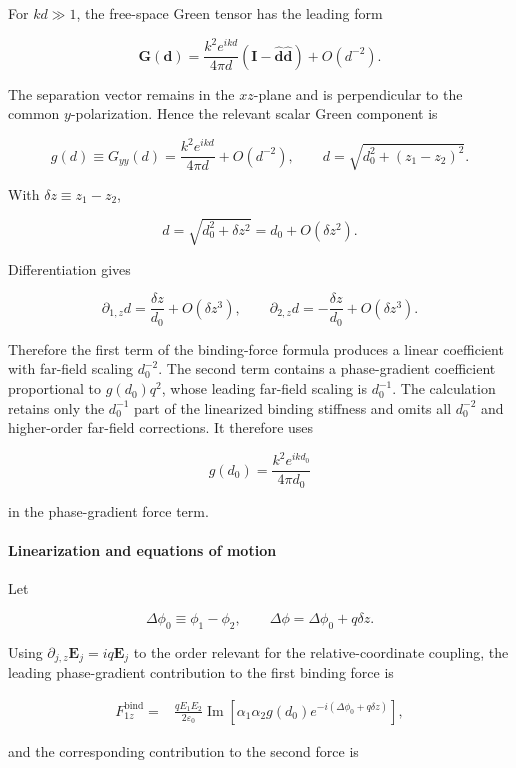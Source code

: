 For \(kd\gg1\), the free-space Green tensor has the leading form

\[
\mathbf G(\mathbf d)
=\frac{k^2e^{ikd}}{4\pi d}
\left(\mathbf I-\hat{\mathbf d}\hat{\mathbf d}\right)+O(d^{-2}).
\]

The separation vector remains in the \(xz\)-plane and is perpendicular to
the common \(y\)-polarization.  Hence the relevant scalar Green component is

\[
g(d)\equiv G_{yy}(d)
=\frac{k^2e^{ikd}}{4\pi d}+O(d^{-2}),
\qquad
d=\sqrt{d_0^2+(z_1-z_2)^2}.
\]

With \(\delta z\equiv z_1-z_2\),

\[
d=\sqrt{d_0^2+\delta z^2} =d_0+O(\delta z^2).
\]

Differentiation gives

\[
\partial_{1,z}d=\frac{\delta z}{d_0}+O(\delta z^3),
\qquad
\partial_{2,z}d=-\frac{\delta z}{d_0}+O(\delta z^3).
\]

Therefore the first term of the binding-force formula produces a linear
coefficient with far-field scaling \(d_0^{-2}\).  The second term contains a
phase-gradient coefficient proportional to \(g(d_0)q^2\), whose leading
far-field scaling is \(d_0^{-1}\).  The calculation retains only the
\(d_0^{-1}\) part of the linearized binding stiffness and omits all
\(d_0^{-2}\) and higher-order far-field corrections.  It therefore uses

\[
g(d_0)=\frac{k^2e^{ikd_0}}{4\pi d_0}
\]

in the phase-gradient force term.

\paragraph*{Linearization and equations of motion}

Let

\[
\Delta\phi_0\equiv\phi_1-\phi_2, \qquad \Delta\phi=\Delta\phi_0+q\delta z.
\]

Using \(\partial_{j,z}\mathbf E_j=iq\mathbf E_j\) to the order relevant for
the relative-coordinate coupling, the leading phase-gradient contribution to
the first binding force is

\[
\begin{aligned}
F_{1z}^{\mathrm{bind}}
={}&\frac{qE_1E_2}{2\varepsilon_0}
\operatorname{Im}\!\left[
\alpha_1\alpha_2g(d_0)e^{-i(\Delta\phi_0+q\delta z)}
\right],
\end{aligned}
\]

and the corresponding contribution to the second force is

